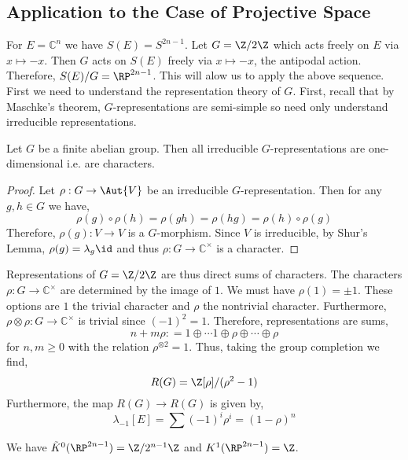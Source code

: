 \documentclass[12pt]{extarticle}
\newcommand{\C}{\mathbb{C}}
\begin{document}
\subsection{Application to the Case of Projective Space}

\begin{rmk}
For $E = \C^n$ we have $S(E) = S^{2n - 1}$. Let $G = \Z/2\Z$ which acts freely on $E$ via $x \mapsto -x$. Then $G$ acts on $S(E)$ freely via $x \mapsto -x$, the antipodal action. Therefore, $S(E)/G = \RP^{2n - 1}$. This will alow us to apply the above sequence. First we need to understand the representation theory of $G$. First, recall that by Maschke's theorem, $G$-representations are semi-simple so need only understand irreducible representations. 
\end{rmk}

\begin{theorem}
Let $G$ be a finite abelian group. Then all irreducible $G$-representations are one-dimensional i.e. are characters. 
\end{theorem}

\begin{proof}
Let $\rho : G \to \Aut{V}$ be an irreducible $G$-representation. Then for any $g, h \in G$ we have,
\[ \rho(g) \circ \rho(h) = \rho(gh) = \rho(hg) = \rho(h) \circ \rho(g) \]
Therefore, $\rho(g) : V \to V$ is a $G$-morphism. Since $V$ is irreducible, by Shur's Lemma, $\rho(g) = \lambda_g \id$ and thus $\rho : G \to \C^\times$ is a character.   
\end{proof}


\begin{example}
Representations of $G = \Z / 2 \Z$ are thus direct sums of characters. The characters $\rho : G \to \C^\times$ are determined by the image of $1$. We must have $\rho(1) = \pm 1$. These options are $1$ the trivial character and $\rho$ the nontrivial character. Furthermore, $\rho \otimes \rho : G \to \C^\times$ is trivial since $(-1)^2 = 1$. Therefore, representations are sums,
\[ n + m \rho : = 1 \oplus \cdots 1 \oplus \rho \oplus \cdots \oplus \rho \]
for $n, m \ge 0$ with the relation $\rho^{\otimes 2} = 1$. Thus, taking the group completion we find,
\[ R(G) = \Z[\rho]/(\rho^2 - 1) \]
Furthermore, the map $R(G) \to R(G)$ is given by,
\[ \lambda_{-1} [E] = \sum (-1)^i \rho^i = (1 - \rho)^n \]
\end{example}

\begin{prop}
We have $\tilde{K}^0(\RP^{2n - 1}) = \Z / 2^{n-1} \Z$ and $K^1(\RP^{2n-1}) = \Z$.
\end{prop}
\end{document}
